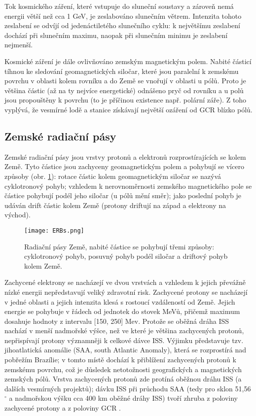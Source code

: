 Tok kosmického záření, které vstupuje do sluneční soustavy a zároveň nemá energii větší než cca 1 GeV, je zeslabováno slunečním větrem. Intenzita tohoto zeslabení se odvíjí od jedenáctiletého slunečního cyklu: k největšímu zeslabení dochází při slunečním maximu, naopak při slunečním minimu je zeslabení nejmenší. 

Kosmické záření je dále ovlivňováno zemským magnetickým polem. Nabité částicí tíhnou ke sledování geomagnetických siločar, které jsou paralelní k zemskému povrchu v oblasti kolem rovníku a do Země se vnořují v oblasti u pólů. Proto je většina částic (až na ty nejvíce energetické) odnášeno pryč od rovníku a u polů jsou propouštěny k povrchu (to je příčinou existence např. polární záře). Z toho vyplývá, že vesmírné lodě a stanice získávají největší ozáření od GCR blízko pólů.

\subsection{Zemské radiační pásy}
Zemské radiační pásy jsou vrstvy protonů a elektronů rozprostírajících se kolem Země. Tyto částice jsou zachyceny geomagnetickým polem a pohybují se vícero způsoby (obr. \ref{fig:ERBs}): rotace částic kolem geomagnetickým siločar se nazývá cyklotronový pohyb; vzhledem k nerovnoměrnosti zemského magnetického pole se částice pohybují podél jeho siločar (u pólů mění směr); jako poslední pohyb je udáván drift částic kolem Země (protony driftují na západ a elektrony na východ).

\begin{figure}[H]
  \centering
  \texttt{[image: ERBs.png]}
  \caption{Radiační pásy Země, nabité částice se pohybují třemi způsoby: cyklotronový pohyb, posuvný pohyb podél siločar a driftový pohyb kolem Země. \cite{benton}}
  \label{fig:ERBs}
\end{figure}

Zachycené elektrony se nacházejí ve dvou vrstvách a vzhledem k jejich převážně nízké energii nepředstavují veliký zdravotní risk. Zachycené protony se nacházejí v jedné oblasti a jejich intenzita klesá s rostoucí vzdáleností od Země. Jejich energie se pohybuje v řádech od jednotek do stovek MeVů, přičemž maximum dosahuje hodnoty z intervalu [150, 250] Mev. Protože se oběžná dráha ISS nachází v menší nadmořské výšce, než ve které je většina zachycených protonů, nepřispívají protony významněji k celkové dávce ISS. Výjimku představuje tzv. jihoatlatická anomálie (SAA, south Atlantic Anomaly), která se rozprostírá nad pobřežím Brazílie; v tomto místě dochází k přiblížení zachycených protonů k zemskému povrchu, což je důsledek netotožnosti geografických a magnetických zemských pólů.
Vrstva zachycených protonů zde protíná oběžnou dráhu ISS (a dalších vesmírných projektů); dávku ISS při průchodu SAA (tedy pro sklon 51,56$^\circ$ a nadmořskou výšku cca 400 km oběžné dráhy ISS)  tvoří zhruba z poloviny zachycené protony a z poloviny GCR \cite{benton}. 

